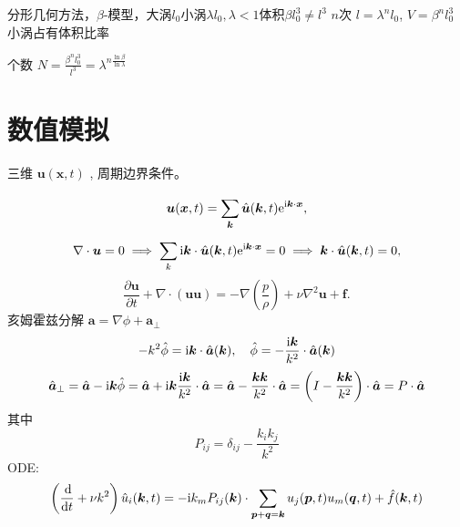 \documentclass[12pt]{ctexart}
\begin{document}
分形几何方法，$\beta$-模型，大涡$l_0$小涡$\lambda l_0,\lambda<1$体积$\beta l_0^3 \neq l^3$ $n$次 $l = \lambda^{n}l_0$, $V = \beta^{n} l_0^{3}$ 小涡占有体积比率

个数 $N = \frac{\beta^{n}l_0^{3}}{l^{3}} = \lambda^{n \frac{\ln \beta}{\ln \lambda}}$


\section{数值模拟}

三维 $\bm{u} (\bm{x} ,t)$ , 周期边界条件。

\begin{equation}
   \bm{u} (\bm{x} , t) = \sum_{\bm{k} }^{} \hat{\bm{u} } (\bm{k} ,t) \mathrm{e}^{\mathrm{i} \bm{k} \cdot \bm{x} },
\end{equation}
\begin{equation}
   \nabla \cdot \bm{u} = 0 \implies \sum_{k}^{} \mathrm{i} \bm{k} \cdot \hat{\bm{u} } (\bm{k} ,t) \mathrm{e}^{\mathrm{i} \bm{k} \cdot \bm{x} } = 0 \implies \bm{k} \cdot \hat{\bm{u} }(\bm{k} ,t)=0, 
\end{equation}
\begin{equation}
   \frac{\partial \bm{u} }{\partial t}  + \nabla \cdot (\bm{u} \bm{u} ) = - \nabla \left( \frac{p}{\rho} \right) + \nu \nabla ^2 \bm{u} + \bm{f}.
\end{equation}
亥姆霍兹分解 $\bm{a} = \nabla \phi + \bm{a}_{\bot}$
\begin{equation}
   -k^2 \hat{\phi} = \mathrm{i} \bm{k}  \cdot \hat{\bm{a} }(\bm{k} ),\quad \hat{\phi} = - \frac{\mathrm{i} \bm{k} }{k^2} \cdot \hat{\bm{a} }(\bm{k} )
\end{equation}
\begin{equation}
   \hat{\bm{a} }_{\bot} = \hat{\bm{a} } - \mathrm{i} \bm{k} \hat{\phi} = \hat{\bm{a} } + \mathrm{i} \bm{k} \frac{\mathrm{i} \bm{k} }{k^2}\cdot \hat{\bm{a} } = \hat{\bm{a} } - \frac{\bm{k} \bm{k} }{k^2}\cdot \hat{\bm{a} } = \left( I - \frac{\bm{k} \bm{k} }{k^2} \right) \cdot \hat{\bm{a} } = P \cdot \hat{\bm{a} }
\end{equation}
其中
\begin{equation}
   P_{ij} = \delta_{ij} - \frac{k_i k_j}{k^2}
\end{equation}
ODE:
\begin{equation}
   \left( \frac{\dif }{\dif t} + \nu k^2 \right) \hat{u}_i (\bm{k} ,t) = - \mi k_m P_{ij} (\bm{k} ) \cdot \sum_{\bm{p} + \bm{q} = \bm{k} }^{} u_j (\bm{p} ,t) u_m(\bm{q} ,t) + \hat{f}(\bm{k} ,t)
\end{equation}
\end{document}

